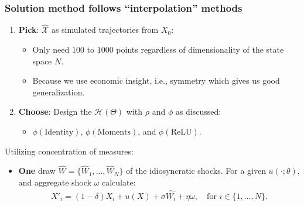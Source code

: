 \documentclass[aspectratio=169,10pt]{beamer}
\newcommand{\emphcolor}[1]{\textbf{\textcolor{emphcolorval}{#1}}}
\newcommand{\Xtrain}{\hat{\mathcal{X}}}
\begin{document}
	
	
	
	
	
	
	
	\begin{frame}
		\frametitle{Solution method follows ``interpolation'' methods}
		\begin{enumerate}
			\item \emphcolor{Pick}: $\Xtrain$ as simulated trajectories from $X_0$:\vspace{0.1in}
			\begin{itemize}
				\item Only need $100$ to $1000$ points regardless of dimensionality of the state space $N$.\vspace{0.1in}
				\item Because we use economic insight, i.e., symmetry which gives us good generalization. \vspace{0.1in}
			\end{itemize}
			\item \emphcolor{Choose}:  Design the $\mathcal{H}(\Theta)$ with $\rho$ and $\phi$ as discussed:\vspace{0.1in}
			\begin{itemize}
				\item $\phi(\text{Identity})$, $\phi(\text{Moments})$, and  $\phi(\text{ReLU})$.\vspace{0.1in}
			\end{itemize}
   \end{enumerate}

	Utilizing concentration of measures:\vspace{0.1in}
	\begin{itemize}
		\item\emphcolor{One} draw $\hat{W}= \{\hat{W}_1,\ldots,\hat{W}_N\}$ of the idiosyncratic shocks. For a given $u(\cdot;\theta)$, and aggregate shock $\omega$ calculate:
		\begin{align*}
			X'_i = (1-\delta)X_i + u(X) + \sigma \hat{W_i} + \eta \omega,\quad\text{for } i \in \{1,...,N\}.
		\end{align*}
	\end{itemize}		 
	\end{frame}
	
\end{document}
